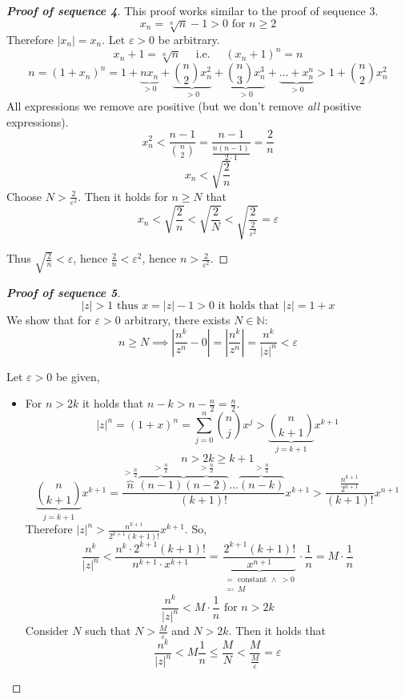 \documentclass[a4paper,landscape,twocolumn]{article}
\theoremstyle{definition}
\newcommand\abs[1]{\left|#1\right|}
\begin{document}
\begin{proof}[\textbf{Proof of sequence 4}]
  This proof works similar to the proof of sequence 3.
  \[ x_n = \sqrt[n]{n} - 1 > 0 \text{ for } n \geq 2 \]
  Therefore $\abs{x_n} = x_n$. Let $\varepsilon > 0$ be arbitrary.
  \[ x_n + 1 = \sqrt[n]{n} \quad\text{ i.e. }\quad (x_n + 1)^n = n \]
  \[
      n = (1 + x_n)^n
      = 1 + \underbrace{nx_n}_{> 0} + \underbrace{\binom n2 x_n^2}_{> 0} + \underbrace{\binom n3 x_n^3}_{>0} + \underbrace{\dots + x_n^n}_{> 0}
      > 1 + \binom n2 x_n^2
  \]
  All expressions we remove are positive (but we don't remove \emph{all} positive expressions).
  \[ x_n^2 < \frac{n-1}{\binom n2} = \frac{n-1}{\frac{n(n-1)}{2 \cdot 1}} = \frac2n \]
  \[ x_n < \sqrt{\frac2n} \]
  Choose $N > \frac2{\varepsilon^2}$. Then it holds for $n \geq N$ that
  \[ x_n < \sqrt{\frac2n} < \sqrt{\frac2N} < \sqrt{\frac2{\frac2{\varepsilon^2}}} = \varepsilon \]

  Thus $\sqrt{\frac2n} < \varepsilon$, hence $\frac2n < \varepsilon^2$, hence $n > \frac2{\varepsilon^2}$.
\end{proof}

\begin{proof}[\textbf{Proof of sequence 5}]
  \[ \abs{z} > 1 \text{ thus } x = \abs{z} - 1 > 0 \text{ it holds that } \abs{z} = 1 + x \]
  We show that for $\varepsilon > 0$ arbitrary, there exists $N \in \mathbb N$:
  \[ n \geq N \implies \abs{\frac{n^k}{z^n} - 0} = \abs{\frac{n^k}{z^n}} = \frac{n^k}{\abs{z}^n} < \varepsilon \]

  Let $\varepsilon > 0$ be given,
  \begin{itemize}
    \item
      For $n > 2k$ it holds that $n - k > n - \frac{n}2 = \frac{n}2$.
      \[ \abs{z}^n = (1 + x)^n = \sum_{j=0}^n \binom{n}{j} x^j > \underbrace{\binom{n}{k + 1}}_{j=k+1} x^{k+1} \]
      \[ n > 2k \geq k + 1 \]
      \[
          \underbrace{\binom{n}{k + 1}}_{j=k+1} x^{k+1}
          = \frac{\overbrace{n}^{>\frac{n}2} \overbrace{(n-1)}^{>\frac{n}2} \overbrace{(n-2)}^{>\frac{n}2} \dots \overbrace{(n-k)}^{>\frac{n}2}}{(k+1)!} x^{k+1}
          > \frac{\frac{n^{k+1}}{2^{n+1}}}{(k+1)!} x^{n+1}
      \]
      Therefore $\abs{z}^n > \frac{n^{k+1}}{2^{k+1} (k+1)!} x^{k+1}$.
      So,
      \[
          \frac{n^k}{\abs{z}^n} <
          \frac{n^k \cdot 2^{k+1} (k+1)!}{n^{k+1} \cdot x^{k+1}} =
          \underbrace{\frac{2^{k+1} (k+1)!}{x^{n+1}}}_{\substack{= \text{ constant } \land\ >0 \\ \eqqcolon\ M}} \cdot \frac1n
          = M \cdot \frac1n
      \] \[
          \frac{n^k}{\abs{z}^n} < M \cdot \frac1n \text{ for } n > 2k
      \]
      Consider $N$ such that $N > \frac{M}{\varepsilon}$ and $N > 2k$.
      Then it holds that
      \[ \frac{n^k}{\abs{z}^n} < M \frac1n \leq \frac{M}{N} < \frac{M}{\frac{M}{\varepsilon}} = \varepsilon \]
  \end{itemize}
\end{proof}
\end{document}
